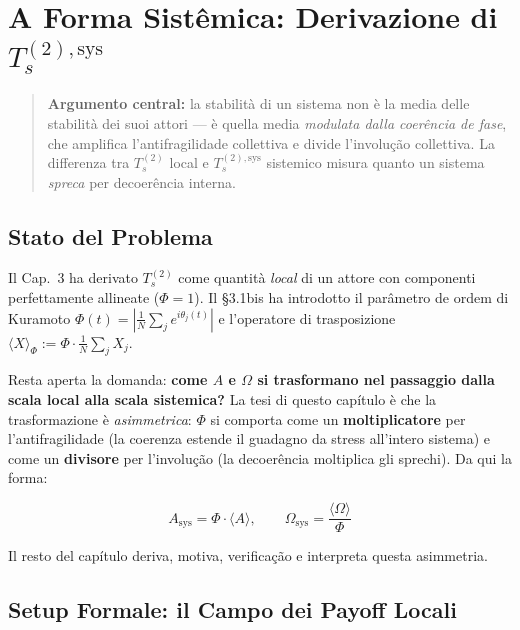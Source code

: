 \chapter{\texorpdfstring{A Forma Sistêmica: Derivazione di
\(T_s^{(2),\text{sys}}\)}{A Forma Sistêmica: Derivazione di T\_s\^{}\{(2),\textbackslash text\{sys\}\}}}\label{la-forma-sistemica-derivazione-di-t_s2textsys}

\begin{quote}
\textbf{Argumento central:} la stabilità di un sistema non è la media
delle stabilità dei suoi attori --- è quella media \emph{modulata dalla
coerência de fase}, che amplifica l'antifragilidade collettiva e divide
l'involução collettiva. La differenza tra \(T_s^{(2)}\) local e
\(T_s^{(2),\text{sys}}\) sistemico misura quanto un sistema
\emph{spreca} per decoerência interna.
\end{quote}



\section{Stato del Problema}\label{stato-del-problema}

Il Cap.~3 ha derivato \(T_s^{(2)}\) come quantità \emph{local} di un
attore con componenti perfettamente allineate (\(\Phi = 1\)). Il \S{}3.1bis
ha introdotto il parâmetro de ordem di Kuramoto
\(\Phi(t) = \left|\frac{1}{N}\sum_j e^{i\theta_j(t)}\right|\) e
l'operatore di trasposizione
\(\langle X \rangle_\Phi := \Phi \cdot \frac{1}{N}\sum_j X_j\).

Resta aperta la domanda: \textbf{come \(A\) e \(\Omega\) si trasformano
nel passaggio dalla scala local alla scala sistemica?} La tesi di
questo capítulo è che la trasformazione è \emph{asimmetrica}: \(\Phi\)
si comporta come un \textbf{moltiplicatore} per l'antifragilidade (la
coerenza estende il guadagno da stress all'intero sistema) e come un
\textbf{divisore} per l'involução (la decoerência moltiplica gli
sprechi). Da qui la forma:

\[
A_{\text{sys}} = \Phi \cdot \langle A \rangle, \qquad \Omega_{\text{sys}} = \frac{\langle \Omega \rangle}{\Phi}
\]

Il resto del capítulo deriva, motiva, verificação e interpreta questa
asimmetria.



\section{Setup Formale: il Campo dei Payoff
Locali}\label{setup-formale-il-campo-dei-payoff-locali}

